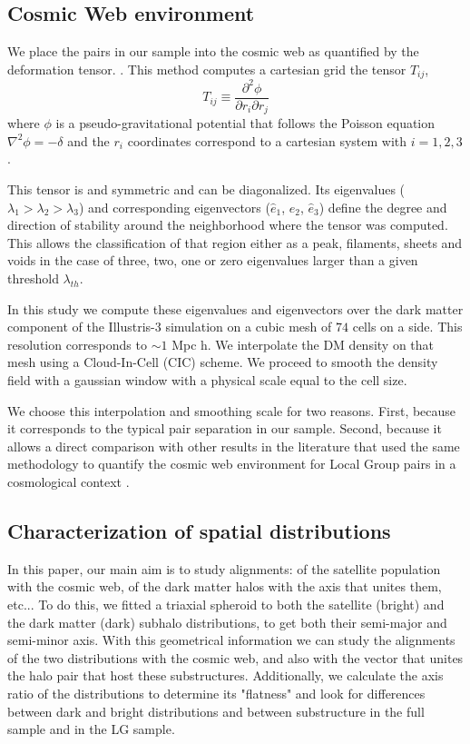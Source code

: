 \subsection{Cosmic Web environment}
We place the pairs in our sample into the cosmic web as quantified by
the deformation tensor.
\citep{2007MNRAS.375..489H,2009MNRAS.396.1815F}.
This method computes a cartesian grid the tensor $T_{ij}$,
\begin{equation}
T_{ij} \equiv \frac{\partial^2\phi}{\partial r_i \partial r_j}
\end{equation}
%
where $\phi$ is a pseudo-gravitational potential that follows the
Poisson equation $\nabla^2\phi=-\delta$ and the $r_i$ coordinates
correspond to a cartesian system with $i=1,2,3$. 

This tensor is and symmetric and can be diagonalized.
Its eigenvalues ($\lambda_1 > \lambda_2 > \lambda_3$) and
corresponding eigenvectors ($\hat{e}_1$, $\hat{e}_2$, $\hat{e}_3$)
define the degree and direction of stability around the neighborhood
where the tensor was computed. 
This allows the classification of that region either as a peak,
filaments, sheets and voids in the case of three, two, one or zero
eigenvalues larger than a given threshold $\lambda_{th}$.

In this study we compute these eigenvalues and eigenvectors over the
dark matter component of the Illustris-3 simulation on a cubic mesh of
$74$ cells on a side. 
This resolution corresponds to $\sim 1$ Mpc h.
We interpolate the DM density on that mesh using a Cloud-In-Cell (CIC)
scheme. 
We proceed to smooth the density field with a gaussian window with a
physical scale equal to the cell size. 

We choose this interpolation and smoothing scale for two reasons.
First, because it corresponds to the typical pair separation in our
sample.
Second, because it allows a direct comparison with other results in
the literature that used the same methodology to quantify the cosmic
web environment for Local Group pairs in a cosmological context
\citep{ForeroRomero2013,2015ApJ...799...45F}.  

\subsection{Characterization of spatial distributions}
\label{Method}
In this paper, our main aim is to study alignments: of the
satellite population with the cosmic web, of the dark matter halos
with the axis that unites them, etc... 
To do this, we fitted a triaxial spheroid to both the satellite (bright) and the dark matter (dark) subhalo distributions, to get both their semi-major and semi-minor axis. 
With this geometrical information we can study the alignments of the two distributions with the cosmic web, and also with the vector that unites the halo pair that host these substructures.
Additionally, we calculate the axis ratio of the distributions to determine its "flatness" and look for differences between dark and bright distributions and between substructure in the full sample and in the LG sample.

